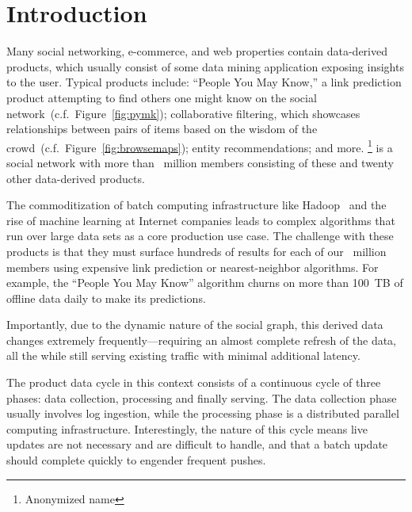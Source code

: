 \section{Introduction}
\label{sec:introduction}

Many social networking, e-commerce, and web properties contain
data-derived products, which usually consist of some data mining
application exposing insights to the user. Typical products include:
``People You May Know,'' a link prediction product attempting to find
others one might know on the social
network~(c.f.~Figure~\ref{fig:pymk}); collaborative filtering, which
showcases relationships between pairs of items based on the wisdom of
the crowd~(c.f.~Figure~\ref{fig:browsemaps}); entity
recommendations; and more. \linkedin\footnote{Anonymized name} is a
social network with more than \members{}~million members consisting of
these and twenty other data-derived products. 

The commoditization of batch computing infrastructure like Hadoop~\cite{hadoop}
 and the rise of machine learning at Internet companies leads to complex
algorithms that run over large data sets as a core production use
case. The challenge with these products is that they must surface
hundreds of results for each of our \members{}~million members using
expensive link prediction or nearest-neighbor algorithms. For example,
the ``People You May Know'' algorithm churns on more than 100~TB of offline data
daily to make its predictions.

Importantly, due to the dynamic nature of the social graph, this
derived data changes extremely frequently---requiring an almost
complete refresh of the data, all the while still serving existing
traffic with minimal additional latency. 

The product data cycle in this context consists of a continuous cycle
of three phases: data collection, processing and finally serving. The
data collection phase usually involves log ingestion, while the
processing phase is a distributed parallel computing infrastructure.
Interestingly, the nature of this cycle means live updates are not
necessary and are difficult to handle, and that a batch
update should complete quickly to engender frequent pushes.
 
